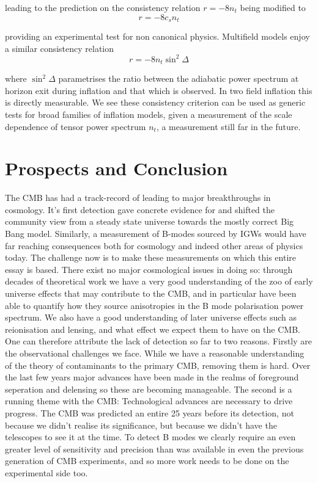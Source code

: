 \documentclass[a4paper,10pt]{article}
\begin{document}
leading to the prediction on the consistency relation $r=-8n_t$ being modified to 
\begin{equation}
r=-8c_sn_t
\end{equation}

providing an experimental test for non canonical physics. Multifield models enjoy a similar consistency relation 
\begin{equation}
r=-8n_t\sin^2\Delta
\end{equation}

where $\sin^2\Delta$ parametrises the ratio between the adiabatic power spectrum at horizon exit during inflation and that which is observed. In two field inflation this is directly measurable. We see these consistency criterion can be used as generic tests for broad families of inflation models, given a measurement of the scale dependence of tensor power spectrum $n_t$, a measurement still far in the future.

\newpage
\section{Prospects and Conclusion}

The CMB has had a track-record of leading to major breakthroughs in cosmology. It's first detection gave concrete evidence for and shifted the community view from a steady state universe towards the mostly correct Big Bang model. Similarly, a measurement of B-modes sourced by IGWs would have far reaching consequences both for cosmology and indeed other areas of physics today. The challenge now is to make these measurements on which this entire essay is based. There exist no major cosmological issues in doing so: through decades of theoretical work we have a very good understanding of the zoo of early universe effects that may contribute to the CMB, and in particular have been able to quantify how they source anisotropies in the B mode polarisation power spectrum. We also have a good understanding of later universe effects such as reionisation and lensing, and what effect we expect them to have on the CMB. \\

One can therefore attribute the lack of detection so far to two reasons. Firstly are the observational challenges we face. While we have a reasonable understanding of the theory of contaminants to the primary CMB, removing them is hard. Over the last few years major advances have been made in the realms of foreground seperation and delensing so these are becoming manageable. The second is a running theme with the CMB: Technological advances are necessary to drive progress. The CMB was predicted an entire 25 years before its detection, not because we didn't realise its significance, but because we didn't have the telescopes to see it at the time. To detect B modes we clearly require an even greater level of sensitivity and precision than was available in even the previous generation of CMB experiments, and so more work needs to be done on the experimental side too.\\
\end{document}
